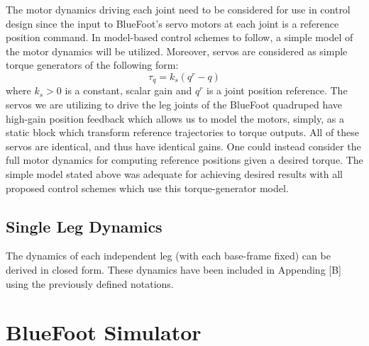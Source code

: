 			The motor dynamics driving each joint need to be considered for use in control design since the input to BlueFoot's servo motors at each joint is a reference position command. In model-based control schemes to follow, a simple model of the motor dynamics will be utilized. Moreover, servos are considered as simple torque generators of the following form:
				\begin{equation}
					\tau_{q} = k_{s}(q^{r}-q)
					\label{eq::servo_control_dynamics}
				\end{equation}
			where $k_{s}>0$ is a constant, scalar gain and $q^{r}$ is a joint position reference. The servos we are utilizing to drive the leg joints of the BlueFoot quadruped have high-gain position feedback which allows us to model the motors, simply, as a static block which transform reference trajectories to torque outputs. All of these servos are identical, and thus have identical gains. One could instead consider the full motor dynamics for computing reference positions given a desired torque. The simple model stated above was adequate for achieving desired results with all proposed control schemes which use this torque-generator model.


		\subsection{Single Leg Dynamics}
			
			The dynamics of each independent leg (with each base-frame fixed) can be derived in closed form. These dynamics have been included in Appending [B] using the previously defined notations.


	\section{BlueFoot Simulator}

